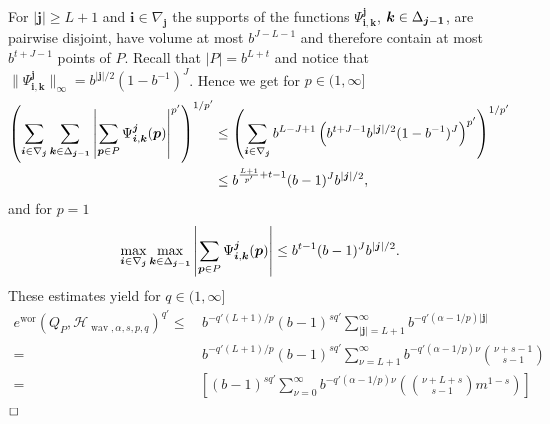 \documentclass[12pt]{article}
\DeclareMathOperator{\wav}{wav}
\DeclareMathOperator{\wor}{wor}
\newenvironment{proof}{\begin{trivlist}
    \item[\hskip\labelsep{\it Proof.}]}{$\hfill\Box$\end{trivlist}}
\newcommand{\bsk}{\boldsymbol{k}}
\newcommand{\bsi}{\boldsymbol{i}}
\newcommand{\bsj}{\boldsymbol{j}}
\newcommand{\bsp}{\boldsymbol{p}}
\newcommand{\HH}{\mathcal{H}}
\begin{document}
\begin{proof}
For $|\bsj| \ge L+1$ and $\bsi \in \nabla_{\bsj}$ the supports of the functions
$\Psi^{\bsj}_{\bsi, \bsk}$, $\bsk\in\Delta_{\bsj-{\bf 1}}$, are pairwise
disjoint, have volume at most $b^{J-L-1}$ and therefore contain at most $b^{t+J-1}$ points of $P$.
Recall that  $|P|=b^{L+t}$ and notice that $\|\Psi^{\bsj}_{\bsi,\bsk} \|_{\infty} = b^{|\bsj|/2}(1-b^{-1})^J$. 
Hence we get for $p\in (1, \infty]$
\begin{equation}\label{p>1}
\begin{split}
\left( \sum_{\bsi\in\nabla_{\bsj}}\sum_{\bsk\in\Delta_{\bsj-{\bf 1}}}
\left| \sum_{\bsp\in P} \Psi^{\bsj}_{\bsi,\bsk}(\bsp) \right|^{p'} \right)^{1/p'}
&\le \left( \sum_{\bsi \in \nabla_{\bsj}} b^{L-J+1} \left( b^{t+J-1}b^{|\bsj|/2}(1-b^{-1})^J \right)^{p'} \right)^{1/p'}\\
&\le b^{\frac{L+1}{p'} +t -1} (b-1)^{J} b^{|\bsj|/2},
\end{split}
\end{equation}
and for $p = 1$
\begin{equation}\label{p=1}
\max_{\bsi\in\nabla_{\bsj}}\max_{\bsk\in\Delta_{\bsj-{\bf 1}}}
\left| \sum_{\bsp\in P} \Psi^{\bsj}_{\bsi,\bsk}(\bsp) \right|
\le b^{t -1} (b-1)^{J} b^{|\bsj|/2}.
\end{equation}
These estimates yield for $q\in (1,\infty]$
\begin{equation*}
\begin{split}
e^{\wor}(Q_{P}, \HH_{\wav,\alpha,s,p,q})^{q'} 
\le& \,b^{-q'(L+1)/p} (b-1)^{sq'}
\sum^\infty_{|\bsj|=L+1} b^{-q'(\alpha-1/p)|\bsj|}\\
=& \,b^{-q'(L+1)/p} (b-1)^{sq'}
 \sum^\infty_{\nu = L+1} b^{ -q'\left(\alpha-1/p \right)\nu}
{\nu+s-1 \choose s-1}\\
=&
\left[ (b-1)^{sq'}\sum^\infty_{\nu=0} b^{-q'(\alpha-1/p)\nu}
\left( {\nu + L+s \choose s-1} m^{1-s} \right) \right]

\end{split}
\end{equation*}
\end{proof}
\end{document}
